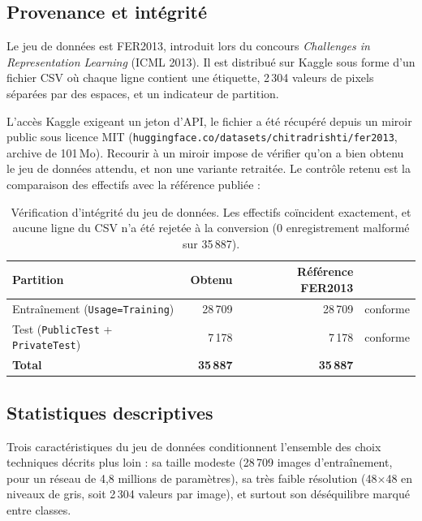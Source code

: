 \documentclass[11pt,a4paper]{article}
\newcommand{\code}[1]{\texttt{\small #1}}
\begin{document}
\subsection{Provenance et intégrité}

Le jeu de données est FER2013, introduit lors du concours \emph{Challenges in
Representation Learning} (ICML 2013). Il est distribué sur Kaggle sous forme
d'un fichier CSV où chaque ligne contient une étiquette, 2\,304 valeurs de
pixels séparées par des espaces, et un indicateur de partition.

L'accès Kaggle exigeant un jeton d'API, le fichier a été récupéré depuis un
miroir public sous licence MIT
(\code{huggingface.co/datasets/chitradrishti/fer2013}, archive de 101\,Mo).
Recourir à un miroir impose de vérifier qu'on a bien obtenu le jeu de données
attendu, et non une variante retraitée. Le contrôle retenu est la comparaison
des effectifs avec la référence publiée :

\begin{table}[h]
\centering
\small
\begin{tabular}{lrrl}
\toprule
\textbf{Partition} & \textbf{Obtenu} & \textbf{Référence FER2013} & \\
\midrule
Entraînement (\code{Usage=Training})        & 28\,709 & 28\,709 & \textcolor{accent}{conforme} \\
Test (\code{PublicTest} + \code{PrivateTest}) & 7\,178  & 7\,178  & \textcolor{accent}{conforme} \\
\midrule
\textbf{Total}                              & \textbf{35\,887} & \textbf{35\,887} & \\
\bottomrule
\end{tabular}
\caption{Vérification d'intégrité du jeu de données. Les effectifs coïncident
exactement, et aucune ligne du CSV n'a été rejetée à la conversion
(0 enregistrement malformé sur 35\,887).}
\end{table}

\subsection{Statistiques descriptives}

Trois caractéristiques du jeu de données conditionnent l'ensemble des choix
techniques décrits plus loin : sa taille modeste (28\,709 images
d'entraînement, pour un réseau de 4{,}8 millions de paramètres), sa très faible
résolution (48$\times$48 en niveaux de gris, soit 2\,304 valeurs par image), et
surtout son déséquilibre marqué entre classes.
\end{document}

